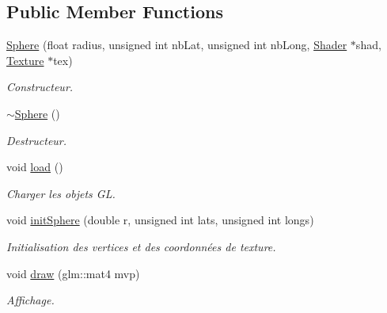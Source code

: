 \subsection*{Public Member Functions}
\begin{DoxyCompactItemize}
\item 
\hypertarget{classSphere_a9966f217c4fd4e67f8aac6bac69001dd}{\hyperlink{classSphere_a9966f217c4fd4e67f8aac6bac69001dd}{Sphere} (float radius, unsigned int nb\-Lat, unsigned int nb\-Long, \hyperlink{classShader}{Shader} $\ast$shad, \hyperlink{classTexture}{Texture} $\ast$tex)}\label{classSphere_a9966f217c4fd4e67f8aac6bac69001dd}

\begin{DoxyCompactList}\small\item\em Constructeur. \end{DoxyCompactList}\item 
\hypertarget{classSphere_a569c071e50a3e11f678630ee1a17737e}{\hyperlink{classSphere_a569c071e50a3e11f678630ee1a17737e}{$\sim$\-Sphere} ()}\label{classSphere_a569c071e50a3e11f678630ee1a17737e}

\begin{DoxyCompactList}\small\item\em Destructeur. \end{DoxyCompactList}\item 
\hypertarget{classSphere_a9ae197a2b240049447bb0405a5916072}{void \hyperlink{classSphere_a9ae197a2b240049447bb0405a5916072}{load} ()}\label{classSphere_a9ae197a2b240049447bb0405a5916072}

\begin{DoxyCompactList}\small\item\em Charger les objets G\-L. \end{DoxyCompactList}\item 
\hypertarget{classSphere_a25ad89145b9d03ffb97ef88d4b9598e8}{void \hyperlink{classSphere_a25ad89145b9d03ffb97ef88d4b9598e8}{init\-Sphere} (double r, unsigned int lats, unsigned int longs)}\label{classSphere_a25ad89145b9d03ffb97ef88d4b9598e8}

\begin{DoxyCompactList}\small\item\em Initialisation des vertices et des coordonnées de texture. \end{DoxyCompactList}\item 
\hypertarget{classSphere_a1fea410bb099ab2b60707ed71186c17c}{void \hyperlink{classSphere_a1fea410bb099ab2b60707ed71186c17c}{draw} (glm\-::mat4 mvp)}\label{classSphere_a1fea410bb099ab2b60707ed71186c17c}

\begin{DoxyCompactList}\small\item\em Affichage. \end{DoxyCompactList}\end{DoxyCompactItemize}
